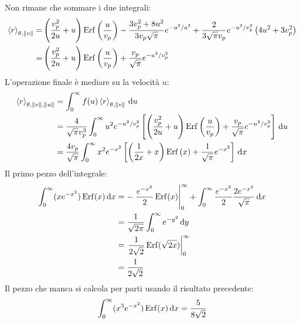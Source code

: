 Non rimane che sommare i due integrali:
\begin{equation}
	\begin{aligned}
		\left<r\right>_{\theta,\left\lVert v\right\rVert}= & \left(\frac{v_p^2}{2 u} + u\right) \operatorname{Erf}\left(\frac{u}{v_p}\right)-\frac{3 v_p^2 + 8 u^2}{3 v_p \sqrt{\pi}}e^{-u^2/a^2} + \frac{2}{3\sqrt{\pi}v_p}e^{-u^2/v_p^2}\left(4u^2+3v_p^2\right) \\
		=                            & \left(\frac{v_p^2}{2 u} + u\right) \operatorname{Erf}\left(\frac{u}{v_p}\right) + \frac{v_p}{\sqrt{\pi}}e^{-u^2/v_p^2}
	\end{aligned}
\end{equation}
L'operazione finale è mediare su la velocità $u$:
\begin{equation}
	\begin{aligned}
		\left<r\right>_{\theta,\left\lVert v\right\rVert,\left\lVert u\right\rVert} & = \int_0^\infty f(u) \left<r\right>_{\theta,\left\lVert v\right\rVert}\,\mathrm{d} u                                                                                                                                 \\
		                                     & = \frac{4}{\sqrt{\pi}v_p^3}\int_0^\infty u^2 e^{-u^2/v_p^2}\left[\left(\frac{v_p^2}{2 u} + u\right) \operatorname{Erf}\left(\frac{u}{v_p}\right) + \frac{v_p}{\sqrt{\pi}}e^{-u^2/v_p^2}\right]\,\mathrm{d} u \\
		                                     & = \frac{4v_p}{\sqrt{\pi}}\int_0^\infty x^2 e^{-x^2}\left[\left(\frac{1}{2 x} + x\right) \operatorname{Erf}\left(x\right) + \frac{1}{\sqrt{\pi}}e^{-x^2}\right]\,\mathrm{d} x
	\end{aligned}
\end{equation}
Il primo pezzo dell'integrale:
\begin{equation}
	\begin{aligned}
		\int_0^\infty (x e^{-x^2}) \operatorname{Erf}(x)\,\mathrm{d} x & = -\left.\frac{e^{-x^2}}{2}\operatorname{Erf}(x)\right|_0^\infty + \int_0^\infty \frac{e^{-x^2}}{2}\frac{2 e^{-x^2}}{\sqrt{\pi}}\,\mathrm{d} x \\
		                                          & =\frac{1}{\sqrt{2\pi}}\int_0^\infty e^{-y^2}\,\mathrm{d} y                                                                       \\
		                                          & =\left.\frac{1}{2\sqrt{2}}\operatorname{Erf}(\sqrt{2x})\right|_0^\infty                                                                 \\
		                                          & =\frac{1}{2\sqrt{2}}
	\end{aligned}
\end{equation}
Il pezzo che manca si calcola per parti usando il risultato precedente:
\begin{equation}
	\int_0^\infty (x^3 e^{-x^2}) \operatorname{Erf}(x)\,\mathrm{d} x = \frac{5}{8 \sqrt{2}}
\end{equation}

